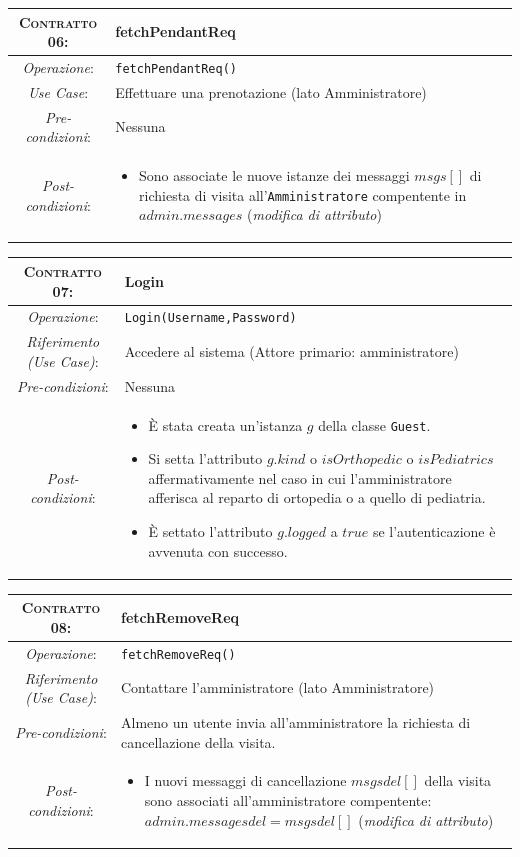 \begin{tabularx}{\columnwidth}{cX}
\toprule
\textsc{Contratto 06}:& \textbf{fetchPendantReq}\\
\midrule
\textit{Operazione}: & 	\texttt{fetchPendantReq()}\\
\textit{Use Case}: &	Effettuare una prenotazione (lato Amministratore)\\
\textit{Pre-condizioni}: &  Nessuna\\
\textit{Post-condizioni}: & \begin{itemize}
\item Sono associate le nuove istanze dei messaggi $msgs[]$ di richiesta di visita 
	all'\texttt{Amministratore} compentente in $admin.messages$ (\textit{modifica di attributo})
\end{itemize}\\
\bottomrule
\end{tabularx}
\medskip


\begin{tabularx}{\columnwidth}{cX}
\toprule
\textsc{Contratto 07}: & 	\textbf{Login}\\
\midrule
\textit{Operazione}: & 		\texttt{Login(Username,Password)}\\
\textit{Riferimento (Use Case)}: &	Accedere al sistema (Attore primario: amministratore)\\
\textit{Pre-condizioni}: &  	Nessuna\\
\textit{Post-condizioni}: & 	\begin{itemize}
\item È stata creata un'istanza $g$ della classe \texttt{Guest}.
\item Si setta l'attributo $g.kind$ o $isOrthopedic$ o $isPediatrics$ affermativamente nel 
	caso in cui l'amministratore afferisca al reparto di ortopedia o a quello di pediatria.
\item È settato l'attributo $g.logged$ a $true$ se l'autenticazione è avvenuta
	con successo.
\end{itemize}\\
\bottomrule
\end{tabularx}
\medskip

\begin{tabularx}{\columnwidth}{cX}
\toprule
\textsc{Contratto 08}: & 	\textbf{fetchRemoveReq}\\
\midrule
\textit{Operazione}: & 		\texttt{fetchRemoveReq()}\\
\textit{Riferimento (Use Case)}: &	Contattare l'amministratore (lato Amministratore)\\
\textit{Pre-condizioni}: &  	Almeno un utente invia all'amministratore la
				richiesta di cancellazione della visita.\\
\textit{Post-condizioni}: & 	\begin{itemize}
\item I nuovi messaggi di cancellazione $msgsdel[]$ della visita sono associati all'amministratore
	compentente: $admin.messagesdel = msgsdel[]$ (\textit{modifica di attributo})
\end{itemize}\\
\bottomrule
\end{tabularx}
\medskip


